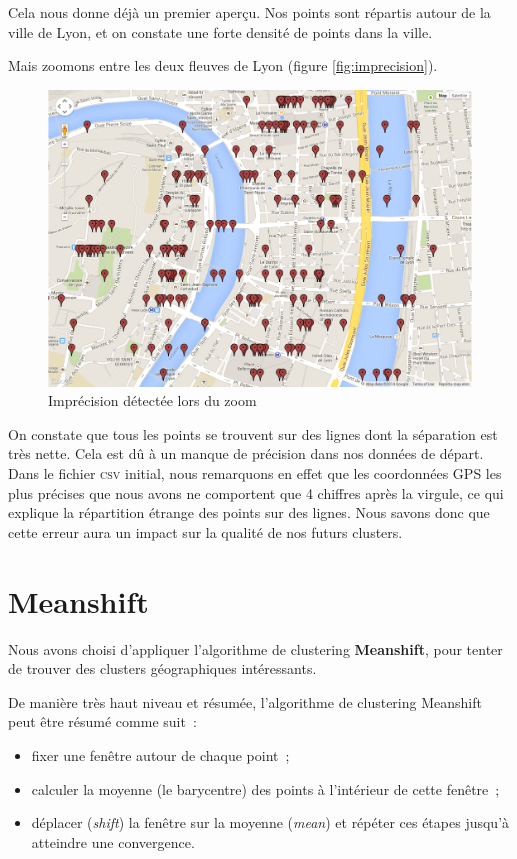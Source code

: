 Cela nous donne déjà un premier aperçu. Nos points sont répartis autour de la ville de Lyon, et on constate une forte densité de points dans la ville.

Mais zoomons entre les deux fleuves de Lyon (figure \vref{fig:imprecision}).

\begin{figure}[!h]
    \centering
    \includegraphics[width=14cm]{images/imprecision.png}
    \caption{Imprécision détectée lors du zoom}
    \label{fig:imprecision}
\end{figure}

On constate que tous les points se trouvent sur des lignes dont la séparation est très nette. Cela est dû à un manque de précision dans nos données de départ. Dans le fichier \textsc{csv} initial, nous remarquons en effet que les coordonnées GPS les plus précises que nous avons ne comportent que 4 chiffres après la virgule, ce qui explique la répartition étrange des points sur des lignes. Nous savons donc que cette erreur aura un impact sur la qualité de nos futurs clusters.


\section{Meanshift}
Nous avons choisi d'appliquer l'algorithme de clustering \textbf{Meanshift}, pour tenter de trouver des clusters géographiques intéressants.

De manière très haut niveau et résumée, l'algorithme de clustering Meanshift peut être résumé comme suit~:
\begin{itemize}
    \item fixer une fenêtre autour de chaque point~;
    \item calculer la moyenne (le barycentre) des points à l'intérieur de cette fenêtre~;
    \item déplacer (\textit{shift}) la fenêtre sur la moyenne (\textit{mean}) et répéter ces étapes jusqu'à atteindre une convergence.\\
\end{itemize}

